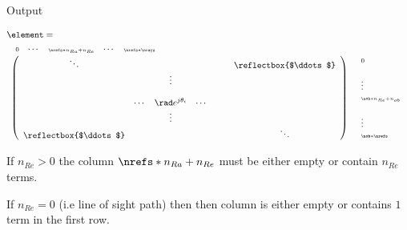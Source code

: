 \documentclass[8pt]{beamer}
\begin{document}
\begin{frame}
\begin{block}{Output}
\begin{minipage}{0.4\linewidth}
\threedgrid
\end{minipage}%
\begin{minipage}{\sepwid}
\mbox{}
\end{minipage}%
\begin{minipage}{0.52\linewidth}
\begin{align*}
& \element= \\
& \begin{array}{l l}
\begin{array}{c c c c c}
\scriptstyle{0} & \cdots & \scriptscriptstyle{\nrefs*n_{Ra}+n_{Re}} & \cdots & \scriptscriptstyle{\nrefs*\nrays}
 \end{array} &
 \\
 \left(
\begin{array}{c c c c c c c}
 \ddots & & & & & & \reflectbox{$\ddots$} \\
 & & \vdots & & & & \\ 
 \\ & \cdots & \rad e^{j\theta_i} & \cdots & & &  \\ & & \vdots & & & & \\
 \reflectbox{$\ddots$} & & & & & & \ddots 
\end{array}
 \right)
    & 
    \begin{array}{l}
    \scriptstyle{0} \\ \\ \vdots \\ \scriptscriptstyle{\nob*n_{Re}+n_{ob}}  \\ \\ \vdots \\ \scriptscriptstyle{\nob*\nrefs}
  \end{array} \\
  \end{array}
\end{align*} 
\end{minipage}
\par If $n_{Re}>0$ the column $\nrefs*n_{Ra}+n_{Re}$ must be either empty or contain $n_{Re}$ terms. \par If $n_{Re}=0$ (i.e line of sight path) then then column is either empty or contains $1$ term in the first row.
\end{block}
\end{frame}
\end{document}
